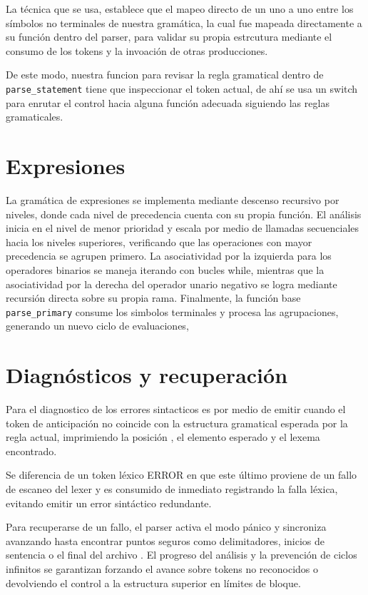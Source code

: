 \documentclass[12pt]{article}
\begin{document}
La técnica que se usa, establece que el mapeo directo de un uno a uno entre
los símbolos no terminales de nuestra gramática, la cual fue mapeada directamente a su función
dentro del parser, para validar su propia estrcutura mediante el consumo de los tokens
y la invoación de otras producciones.

De este modo, nuestra funcion para revisar la regla gramatical dentro de \verb|parse_statement|
tiene que inspeccionar el token actual, de ahí se usa un switch para enrutar el control hacia alguna función
adecuada siguiendo las reglas gramaticales.

\section{Expresiones} 

La gramática de expresiones se implementa mediante descenso recursivo por niveles, 
donde cada nivel de precedencia cuenta con su propia función. El análisis inicia 
en el nivel de menor prioridad y escala por medio de llamadas secuenciales hacia los 
niveles superiores, verificando que las operaciones con mayor precedencia se agrupen 
primero. La asociatividad por la izquierda para los operadores binarios se maneja 
iterando con bucles while, mientras que la asociatividad por la derecha del 
operador unario negativo se logra mediante recursión directa sobre su propia rama. 
Finalmente, la función base \verb|parse_primary| consume los simbolos terminales 
y procesa las agrupaciones, generando un nuevo ciclo de evaluaciones,

\section{Diagnósticos y recuperación}

Para el diagnostico de los errores sintacticos es por medio de emitir cuando el 
token de anticipación no coincide con la estructura gramatical esperada
 por la regla actual, imprimiendo la posición , el elemento esperado y el lexema 
 encontrado. 
 
Se diferencia de un token léxico ERROR en que este último proviene de un 
fallo de escaneo del lexer y es consumido de inmediato registrando la falla léxica, 
evitando emitir un error sintáctico redundante. 

Para recuperarse de un fallo, el parser activa el modo pánico y sincroniza avanzando 
hasta encontrar puntos seguros como delimitadores, inicios de sentencia o el final del 
archivo . El progreso del análisis y la prevención de ciclos 
infinitos se garantizan forzando el avance sobre tokens no reconocidos o 
devolviendo el control a la estructura superior en límites de bloque.
\end{document}
